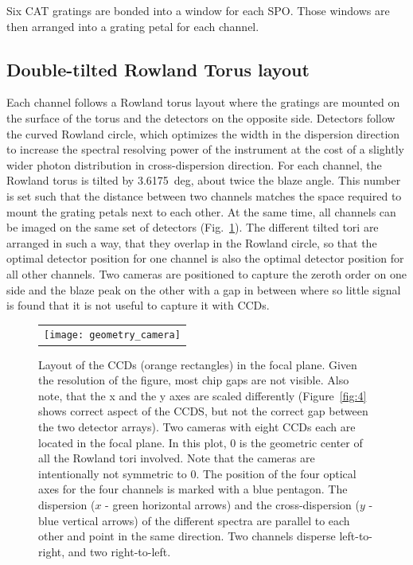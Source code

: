 \documentclass[12pt]{spieman}  %
\begin{document}
\begin{spacing}{1}
Six CAT gratings are bonded into a window for each SPO. Those windows are then arranged into a grating petal for each channel.

\subsection{Double-tilted Rowland Torus layout}
Each channel follows a Rowland torus layout\cite{Beuermann:78} where the gratings are mounted on the surface of the torus and the detectors on the opposite side. Detectors follow the curved Rowland circle, which optimizes the width in the dispersion direction to increase the spectral resolving power of the instrument at the cost of a slightly wider photon distribution in cross-dispersion direction. For each channel, the Rowland torus is tilted by 3.6175~deg, about twice the blaze angle\cite{10.1117/12.856482,10.1117/12.2273011,DTRS}. This number is set such that the distance between two channels matches the space required to mount the grating petals next to each other. At the same time, all channels can be imaged on the same set of detectors (Fig.~\ref{fig:geometry_camera}).
The different tilted tori are arranged in such a way, that they overlap in the Rowland circle, so that the optimal detector position for one channel is also the optimal detector position for all other channels.
Two cameras are positioned to capture the zeroth order on one side and the blaze peak on the other with a gap in between where so little signal is found that it is not useful to capture it with CCDs.

\begin{figure} [ht]
    \begin{center}
    \begin{tabular}{c} %
    \texttt{[image: geometry\_camera]}
    \end{tabular}
    \end{center}
    \caption {\label{fig:geometry_camera}
    Layout of the CCDs (orange rectangles) in the focal plane. Given the resolution of the figure, most chip gaps are not visible. Also note, that the x and the y axes are scaled differently (Figure~\ref{fig:4} shows correct aspect of the CCDS, but not the correct gap between the two detector arrays). Two cameras with eight CCDs each are located in the focal plane. In this plot, 0 is the geometric center of all the Rowland tori involved. Note that the cameras are intentionally not symmetric to 0.
    The position of the four optical axes for the four channels is marked with a blue pentagon.  The dispersion ($x$ - green horizontal arrows) and the cross-dispersion ($y$ - blue vertical arrows) of the different spectra are parallel to each other and point in the same direction. Two channels disperse left-to-right, and two right-to-left.
    }
\end{figure}


\end{spacing}
\end{document}
